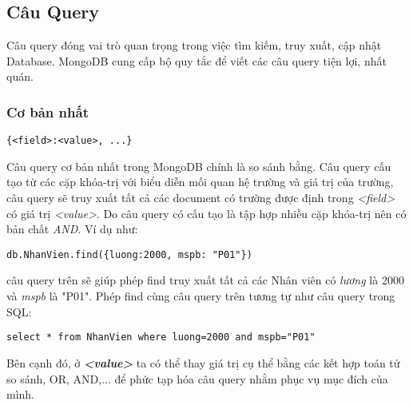 \subsection{Câu Query}
Câu query đóng vai trò quan trọng trong việc tìm kiếm, truy xuất, cập nhật Database. MongoDB cung cấp bộ quy tắc để viết các câu query tiện lợi, nhất quán.
\subsubsection{Cơ bản nhất}
\begin{lstlisting}
{<field>:<value>, ...}
\end{lstlisting}
Câu query cơ bản nhất trong MongoDB chính là so sánh bằng. Câu query cấu tạo từ các cặp khóa-trị với biểu diễn mối quan hệ trường và giá trị của trường, câu query sẽ truy xuất tất cả các document có trường được định trong \textit{<field>} có giá trị \textit{<value>}. Do câu query có cấu tạo là tập hợp nhiều cặp khóa-trị nên có bản chất \textit{AND}. Ví dụ như:
\begin{lstlisting}
db.NhanVien.find({luong:2000, mspb: "P01"})
\end{lstlisting}
câu query trên sẽ giúp phép find truy xuất tất cả các Nhân viên có \textit{lương} là 2000 và \textit{mspb} là 
"P01". Phép find cùng câu query trên tương tự như câu query trong SQL:
\begin{lstlisting}
select * from NhanVien where luong=2000 and mspb="P01"
\end{lstlisting}

Bên cạnh đó, ở \textit{\textbf{<value>}} ta có thể thay giá trị cụ thể bằng các kết hợp toán tử so sánh, OR, AND,... để phức tạp hóa câu query nhằm phục vụ mục đích của mình.
